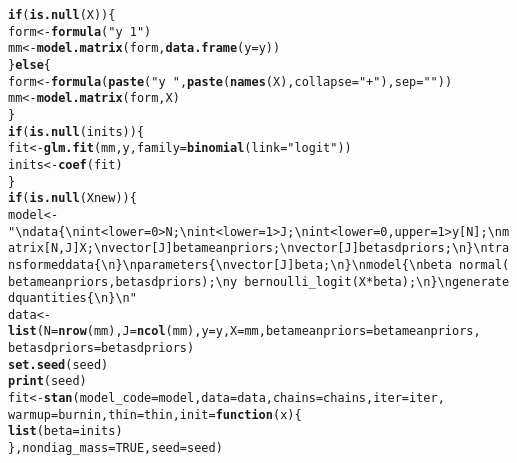 \documentclass{article}\usepackage[]{graphicx}\usepackage[]{color}
\makeatletter
\newcommand{\hlnum}[1]{\textcolor[rgb]{0.686,0.059,0.569}{#1}}%
\newcommand{\hlstr}[1]{\textcolor[rgb]{0.192,0.494,0.8}{#1}}%
\newcommand{\hlstd}[1]{\textcolor[rgb]{0.345,0.345,0.345}{#1}}%
\newcommand{\hlkwa}[1]{\textcolor[rgb]{0.161,0.373,0.58}{\textbf{#1}}}%
\newcommand{\hlkwb}[1]{\textcolor[rgb]{0.69,0.353,0.396}{#1}}%
\newcommand{\hlkwc}[1]{\textcolor[rgb]{0.333,0.667,0.333}{#1}}%
\newcommand{\hlkwd}[1]{\textcolor[rgb]{0.737,0.353,0.396}{\textbf{#1}}}%
\newenvironment{kframe}{%
 \def\at@end@of@kframe{}%
 \ifinner\ifhmode%
  \def\at@end@of@kframe{\end{minipage}}%
  \begin{minipage}{\columnwidth}%
 \fi\fi%
 \def\FrameCommand##1{\hskip\@totalleftmargin \hskip-\fboxsep
 \colorbox{shadecolor}{##1}\hskip-\fboxsep
     \hskip-\linewidth \hskip-\@totalleftmargin \hskip\columnwidth}%
 \MakeFramed {\advance\hsize-\width
   \@totalleftmargin\z@ \linewidth\hsize
   \@setminipage}}%
 {\par\unskip\endMakeFramed%
 \at@end@of@kframe}
\newenvironment{knitrout}{}{} %
\makeatother
\begin{document}
\begin{knitrout}
\begin{kframe}
\begin{alltt}
    \hlkwa{if} \hlstd{(}\hlkwd{is.null}\hlstd{(X)) \{}
        \hlstd{form} \hlkwb{<-} \hlkwd{formula}\hlstd{(}\hlstr{"y ~ 1"}\hlstd{)}
        \hlstd{mm} \hlkwb{<-} \hlkwd{model.matrix}\hlstd{(form,} \hlkwd{data.frame}\hlstd{(}\hlkwc{y} \hlstd{= y))}
    \hlstd{\}} \hlkwa{else} \hlstd{\{}
        \hlstd{form} \hlkwb{<-} \hlkwd{formula}\hlstd{(}\hlkwd{paste}\hlstd{(}\hlstr{"y ~ "}\hlstd{,} \hlkwd{paste}\hlstd{(}\hlkwd{names}\hlstd{(X),} \hlkwc{collapse} \hlstd{=} \hlstr{"+"}\hlstd{),} \hlkwc{sep} \hlstd{=} \hlstr{""}\hlstd{))}
        \hlstd{mm} \hlkwb{<-} \hlkwd{model.matrix}\hlstd{(form, X)}
    \hlstd{\}}
    \hlkwa{if} \hlstd{(}\hlkwd{is.null}\hlstd{(inits)) \{}
        \hlstd{fit} \hlkwb{<-} \hlkwd{glm.fit}\hlstd{(mm, y,} \hlkwc{family} \hlstd{=} \hlkwd{binomial}\hlstd{(}\hlkwc{link} \hlstd{=} \hlstr{"logit"}\hlstd{))}
        \hlstd{inits} \hlkwb{<-} \hlkwd{coef}\hlstd{(fit)}
    \hlstd{\}}
    \hlkwa{if} \hlstd{(}\hlkwd{is.null}\hlstd{(Xnew)) \{}
        \hlstd{model} \hlkwb{<-} \hlstr{"\textbackslash{}n  data \{\textbackslash{}n    int<lower=0>              N;\textbackslash{}n    int<lower=1>              J;\textbackslash{}n    int<lower=0, upper=1>  y[N];\textbackslash{}n    matrix[N,J]               X;\textbackslash{}n    vector[J]    betameanpriors;\textbackslash{}n    vector[J]      betasdpriors;\textbackslash{}n  \}\textbackslash{}n  transformed data \{\textbackslash{}n  \}\textbackslash{}n  parameters \{\textbackslash{}n    vector[J] beta;\textbackslash{}n  \}\textbackslash{}n  model \{\textbackslash{}n    beta ~ normal(betameanpriors,betasdpriors);\textbackslash{}n    y ~ bernoulli_logit( X*beta );\textbackslash{}n  \}\textbackslash{}n  generated quantities \{\textbackslash{}n  \}\textbackslash{}n  "}
        \hlstd{data} \hlkwb{<-} \hlkwd{list}\hlstd{(}\hlkwc{N} \hlstd{=} \hlkwd{nrow}\hlstd{(mm),} \hlkwc{J} \hlstd{=} \hlkwd{ncol}\hlstd{(mm),} \hlkwc{y} \hlstd{= y,} \hlkwc{X} \hlstd{= mm,} \hlkwc{betameanpriors} \hlstd{= betameanpriors,}
            \hlkwc{betasdpriors} \hlstd{= betasdpriors)}
        \hlkwd{set.seed}\hlstd{(seed)}
        \hlkwd{print}\hlstd{(seed)}
        \hlstd{fit} \hlkwb{<-} \hlkwd{stan}\hlstd{(}\hlkwc{model_code} \hlstd{= model,} \hlkwc{data} \hlstd{= data,} \hlkwc{chains} \hlstd{= chains,} \hlkwc{iter} \hlstd{= iter,}
            \hlkwc{warmup} \hlstd{= burnin,} \hlkwc{thin} \hlstd{= thin,} \hlkwc{init} \hlstd{=} \hlkwa{function}\hlstd{(}\hlkwc{x}\hlstd{) \{}
                \hlkwd{list}\hlstd{(}\hlkwc{beta} \hlstd{= inits)}
            \hlstd{\},} \hlkwc{nondiag_mass} \hlstd{=} \hlnum{TRUE}\hlstd{,} \hlkwc{seed} \hlstd{= seed)}

\end{alltt}
\end{kframe}
\end{knitrout}
\end{document}
